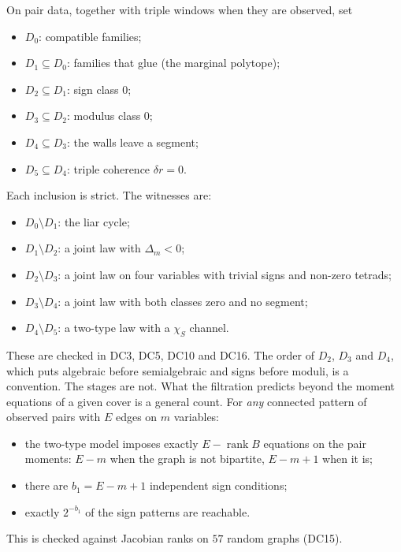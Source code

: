 \documentclass[11pt]{article}
\theoremstyle{definition}\newtheorem{definition}{Definition}\newtheorem{remark}{Remark}
\begin{document}
\begin{corollary}\label{cor:filtration}
On pair data, together with triple windows when they are observed, set
\begin{itemize}
\item $D_0$: compatible families;
\item $D_1\subseteq D_0$: families that glue (the marginal polytope);
\item $D_2\subseteq D_1$: sign class $0$;
\item $D_3\subseteq D_2$: modulus class $0$;
\item $D_4\subseteq D_3$: the walls leave a segment;
\item $D_5\subseteq D_4$: triple coherence $\delta r=0$.
\end{itemize}
Each inclusion is strict. The witnesses are:
\begin{itemize}
\item $D_0\setminus D_1$: the liar cycle;
\item $D_1\setminus D_2$: a joint law with $\Delta_m<0$;
\item $D_2\setminus D_3$: a joint law on four variables with trivial signs and non-zero tetrads;
\item $D_3\setminus D_4$: a joint law with both classes zero and no segment;
\item $D_4\setminus D_5$: a two-type law with a $\chi_S$ channel.
\end{itemize}
These are checked in DC3, DC5, DC10 and DC16. The order of $D_2$, $D_3$ and $D_4$, which puts algebraic before semialgebraic and signs
before moduli, is a convention. The stages are not. What the filtration predicts beyond the moment equations of a given cover is a
general count. For \emph{any} connected pattern of observed pairs with $E$ edges on $m$ variables:
\begin{itemize}
\item the two-type model imposes exactly $E-\operatorname{rank}B$ equations on the pair moments: $E-m$ when the graph is not
  bipartite, $E-m+1$ when it is;
\item there are $b_1=E-m+1$ independent sign conditions;
\item exactly $2^{-b_1}$ of the sign patterns are reachable.
\end{itemize}
This is checked against Jacobian ranks on $57$ random graphs (DC15).
\end{corollary}
\end{document}
